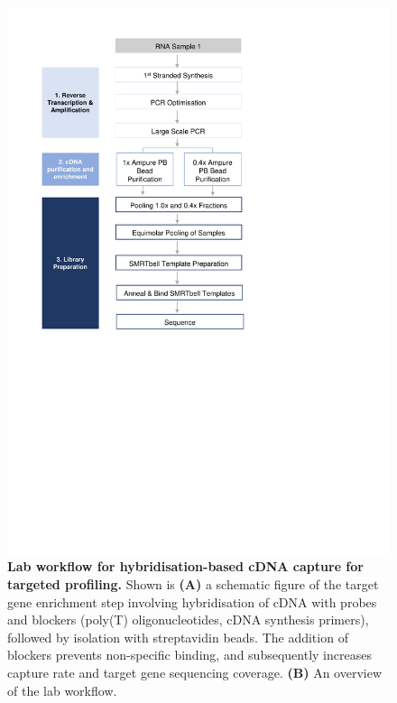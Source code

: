 \begin{figure}[!h]
	\begin{center}
		\includegraphics[page=12,trim={0cm 6cm 0cm 1cm},clip,scale = 0.70]{Figures/ProjectDevelopment_Figures.pdf}
	\end{center}
	\captionsetup{width=0.95\textwidth}
	\caption[Lab workflow for hybridisation-based cDNA capture for targeted profiling]%
	{\textbf{Lab workflow for hybridisation-based cDNA capture for targeted profiling.} Shown is \textbf{(A)} a schematic figure of the target gene enrichment step involving hybridisation of cDNA with probes and blockers (poly(T) oligonucleotides, cDNA synthesis primers), followed by isolation with streptavidin beads. The addition of blockers prevents non-specific binding, and subsequently increases capture rate and target gene sequencing coverage. \textbf{(B)} An overview of the lab workflow.}
	\label{fig:isoseq_targetcapture}
\end{figure}

